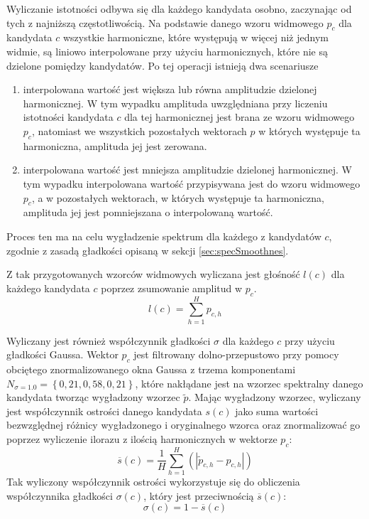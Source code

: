 \documentclass[12pt,a4paper,twoside]{mwart}
\begin{document}
Wyliczanie istotności odbywa się dla każdego kandydata osobno, zaczynając od tych z najniższą częstotliwością. Na podstawie danego wzoru widmowego $p_c$ dla kandydata $c$ wszystkie harmoniczne, które występują w więcej niż jednym widmie, są liniowo interpolowane przy użyciu harmonicznych, które nie są dzielone pomiędzy kandydatów. Po tej operacji istnieją dwa scenariusze
\begin{enumerate}
\item interpolowana wartość jest większa lub równa amplitudzie dzielonej harmonicznej. W tym wypadku amplituda uwzględniana przy liczeniu istotności kandydata $c$ dla tej harmonicznej jest brana ze wzoru widmowego $p_c$, natomiast we wszystkich pozostałych wektorach $p$ w których występuje ta harmoniczna, amplituda jej jest zerowana.
\item interpolowana wartość jest mniejsza amplitudzie dzielonej harmonicznej. W tym wypadku interpolowana wartość przypisywana jest do wzoru widmowego $p_c$, a w pozostałych wektorach, w których występuje ta harmoniczna, amplituda jej jest pomniejszana o interpolowaną wartość.
\end{enumerate}
Proces ten ma na celu wygładzenie spektrum dla każdego z kandydatów $c$, zgodnie z zasadą gładkości opisaną w sekcji \ref{sec:specSmoothnes}.

Z tak przygotowanych wzorców widmowych wyliczana jest głośność $l(c)$ dla każdego kandydata $c$ poprzez zsumowanie amplitud w $p_c$.
\begin{equation}\label{eq:inharmonicity:loudness}
  l(c) = \sum_{h=1}^H p_{c,h}
\end{equation}

Wyliczany jest również współczynnik gładkości $\sigma$ dla każdego $c$ przy użyciu gładkości Gaussa. Wektor $p_c$ jest filtrowany dolno-przepustowo przy pomocy obciętego znormalizowanego okna Gaussa z trzema komponentami $N_{\sigma = 1.0} = \left\{0,21, 0,58, 0,21\right\}$, które nakłądane jest na wzorzec spektralny danego kandydata tworząc wygładzony wzorzec $\widetilde{p}$. Mając wygładzony wzorzec, wyliczany jest współczynnik ostrości danego kandydata $s(c)$ jako suma wartości bezwzględnej różnicy wygładzonego i oryginalnego wzorca oraz znormalizować go poprzez wyliczenie ilorazu z ilością harmonicznych w wektorze $p_c$:
\begin{equation}\label{eq:inharmonicity:sharpness}
  \overline{s}(c) = \frac{1}{H}\sum_{h=1}^H \left(\left|\widetilde{p}_{c,h} - p_{c,h}\right|\right)
\end{equation}
Tak wyliczony współczynnik ostrości wykorzystuje się do obliczenia współczynnika gładkości $\sigma(c)$, który jest przeciwnością $\overline{s}(c)$:
\begin{equation}\label{eq:inharmonicity:smoothnes}
  \sigma(c) = 1 - \overline{s}(c) 
\end{equation}
\end{document}
